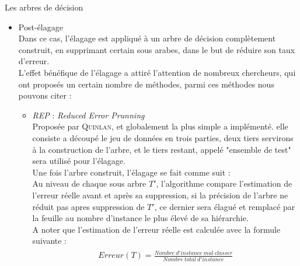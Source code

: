 \documentclass[a4paper, 11pt]{report}
\begin{document}
\begin{chapter}{Les arbres de décision}
\begin{itemize}
\begin{itemize}

\end{itemize}

\item Post-élagage\\
Dans ce cas, l'élagage est appliqué à un arbre de décision complètement construit, en supprimant certain sous arabes, dans le but de réduire son taux d'erreur.\\
L'effet bénéfique de l'élagage a attiré l'attention de nombreux chercheurs, qui ont proposés un certain nombre de méthodes\cite{esposito1997comparative}, parmi ces méthodes nous pouvons citer : \\
\begin{itemize}
\item \emph{REP} : \emph{Reduced Error Prunning}\\
Proposée par \textsc{Quinlan}, et globalement la plus simple a implémenté\cite{quinlan1987simplifying}. elle consiste a découpé le jeu de données en trois parties, deux tiers servirons à la construction de l'arbre, et le tiers restant, appelé "ensemble de test" sera utilisé pour l'élagage.\\
Une fois l'arbre construit, l'élagage se fait comme suit :\\
Au niveau de chaque sous arbre $T'$, l'algorithme compare l'estimation de l'erreur réelle avant et après sa suppression, si la précision de l'arbre ne réduit pas apres suppression de $T'$, ce dernier sera élagué et remplacé par la feuille au nombre d'instance le plus élevé de sa hiérarchie.\\
A noter que l'estimation de l'erreur réelle est calculée avec la formule suivante : \\
\begin{align}
\begin{split}\label{formule:InfoSplit}
Erreur(T) = \frac{Nombre\ d'instance\ mal\ classer}{Nombre\ total\ d'instance}
\end{split}
\end{align}
\end{itemize}
\end{itemize}







\end{chapter}
\end{document}
